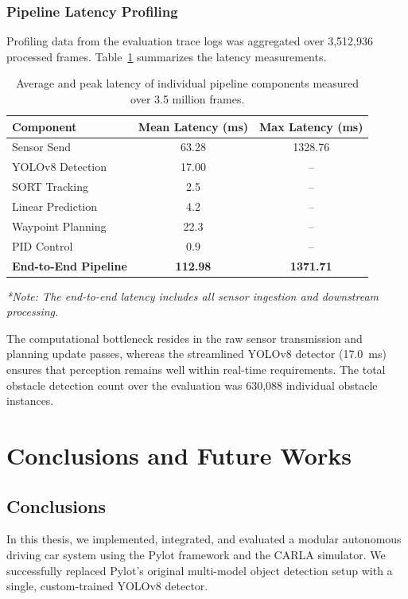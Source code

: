 \documentclass[11pt,a4paper]{report}
\begin{document}
\subsection{Pipeline Latency Profiling}
Profiling data from the evaluation trace logs was aggregated over 3,512,936 processed frames. Table~\ref{tab:latency_profile} summarizes the latency measurements.

\begin{table}[h!]
\centering
\begin{tabular}{lcc}
\toprule
\textbf{Component} & \textbf{Mean Latency (ms)} & \textbf{Max Latency (ms)} \\
\midrule
Sensor Send             & 63.28  & 1328.76 \\
YOLOv8 Detection        & 17.00  & -- \\
SORT Tracking           & 2.5    & -- \\
Linear Prediction       & 4.2    & -- \\
Waypoint Planning       & 22.3   & -- \\
PID Control             & 0.9    & -- \\
\midrule
\textbf{End-to-End Pipeline} & \textbf{112.98} & \textbf{1371.71} \\
\bottomrule
\end{tabular}
\vspace{1ex}

{\small \textit{*Note: The end-to-end latency includes all sensor ingestion and downstream processing.}}
\caption{Average and peak latency of individual pipeline components measured over 3.5 million frames.}
\label{tab:latency_profile}
\end{table}

The computational bottleneck resides in the raw sensor transmission and planning update passes, whereas the streamlined YOLOv8 detector (17.0~ms) ensures that perception remains well within real-time requirements. The total obstacle detection count over the evaluation was 630,088 individual obstacle instances.



\chapter{Conclusions and Future Works}

\section{Conclusions}
In this thesis, we implemented, integrated, and evaluated a modular autonomous driving car system using the Pylot framework and the CARLA simulator. We successfully replaced Pylot's original multi-model object detection setup with a single, custom-trained YOLOv8 detector. 
\end{document}
